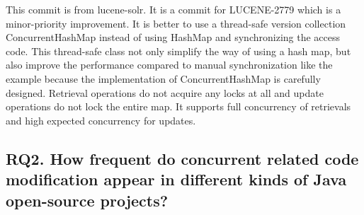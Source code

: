 \documentclass[conference]{IEEEtran}
\begin{document}
This commit is from lucene-solr. It is a commit for LUCENE-2779 which is a minor-priority improvement. It is better to use a thread-safe version collection ConcurrentHashMap instead of using HashMap and synchronizing the access code. This thread-safe class not only simplify the way of using a hash map, but also improve the performance compared to manual synchronization like the example because the implementation of ConcurrentHashMap is carefully designed. Retrieval operations do not acquire any locks at all and update operations do not lock the entire map. It supports full concurrency of retrievals and high expected concurrency for updates.

%
%
%
%
%
%

\subsection{RQ2. How frequent do concurrent related code modification appear in different kinds of Java open-source projects?}
\end{document}
